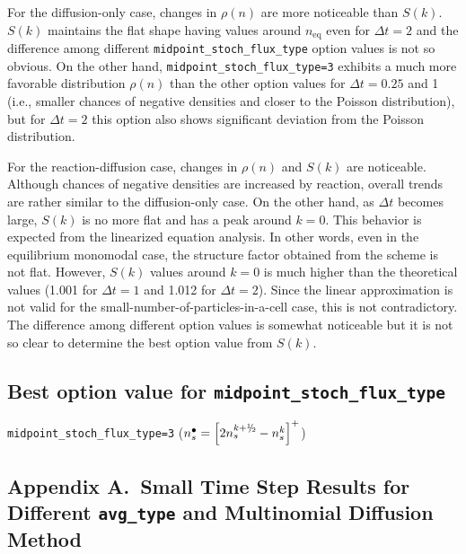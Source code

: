 \documentclass{article}
\def\myhalf {\sfrac{1}{2}}
\newcommand{\sfrac}[2]{\mathchoice
  {\kern0em\raise.5ex\hbox{\the\scriptfont0 #1}\kern-.15em/
   \kern-.15em\lower.25ex\hbox{\the\scriptfont0 #2}}
  {\kern0em\raise.5ex\hbox{\the\scriptfont0 #1}\kern-.15em/
   \kern-.15em\lower.25ex\hbox{\the\scriptfont0 #2}}
  {\kern0em\raise.5ex\hbox{\the\scriptscriptfont0 #1}\kern-.2em/
   \kern-.15em\lower.25ex\hbox{\the\scriptscriptfont0 #2}}
  {#1\!/#2}}
\begin{document}
For the diffusion-only case, changes in $\rho(n)$ are more noticeable than $S(k)$.
$S(k)$ maintains the flat shape having values around $n_\mathrm{eq}$ even for $\Delta t=2$ and the difference among different \texttt{midpoint\_stoch\_flux\_type} option values is not so obvious.
On the other hand, \texttt{midpoint\_stoch\_flux\_type=3} exhibits a much more favorable distribution $\rho(n)$ than the other option values for $\Delta t=0.25$ and 1 (i.e., smaller chances of negative densities and closer to the Poisson distribution), but for $\Delta t=2$ this option also shows significant deviation from the Poisson distribution. 

For the reaction-diffusion case, changes in $\rho(n)$ and $S(k)$ are noticeable.
Although chances of negative densities are increased by reaction, overall trends are rather similar to the diffusion-only case.
On the other hand, as $\Delta t$ becomes large, $S(k)$ is no more flat and has a peak around $k=0$.
This behavior is expected from the linearized equation analysis.
In other words, even in the equilibrium monomodal case, the structure factor obtained from the scheme is not flat.
However, $S(k)$ values around $k=0$ is much higher than the theoretical values (1.001 for $\Delta t=1$ and 1.012 for $\Delta t=2$).
Since the linear approximation is not valid for the small-number-of-particles-in-a-cell case, this is not contradictory.
The difference among different option values is somewhat noticeable but it is not so clear to determine the best option value from $S(k)$.

\subsection*{\textbf{Best option value for \texttt{midpoint\_stoch\_flux\_type}}}

\texttt{midpoint\_stoch\_flux\_type=3} ($n_s^\bullet=\left[2n_s^{k+\myhalf}-n_s^k\right]^+$)

\clearpage

\subsection*{Appendix A.~Small Time Step Results for Different \texttt{avg\_type} and Multinomial Diffusion Method}
\end{document}
